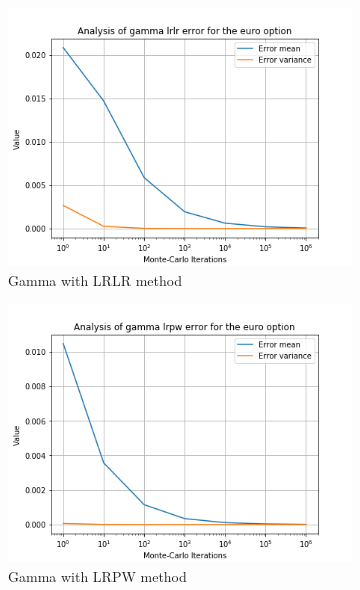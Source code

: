 \documentclass[11pt,a4paper,fleqn,draft]{article}
\begin{document}
\begin{figure}
      \begin{subfigure}[b]{0.3\textwidth}
          \includegraphics[width=\textwidth]{graphs/eurogammalrlr.png}
          \caption{Gamma with LRLR method}
      \end{subfigure}
      \begin{subfigure}[b]{0.3\textwidth}
          \includegraphics[width=\textwidth]{graphs/eurogammalrpw.png}
          \caption{Gamma with LRPW method}
      \end{subfigure}
      \begin{subfigure}[b]{0.3\textwidth}

\end{subfigure}
\end{figure}
\end{document}
